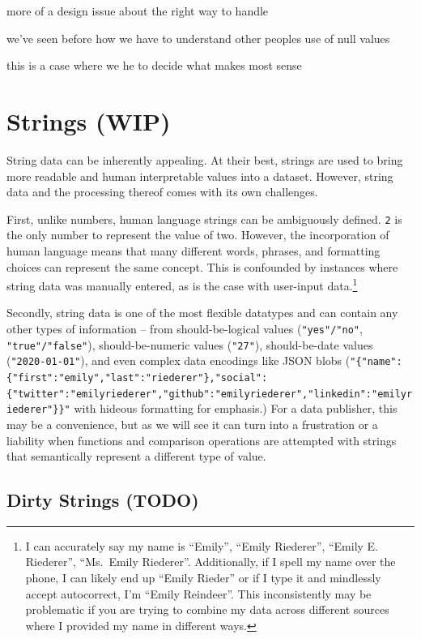 \documentclass[
]{krantz}
\begin{document}
more of a design issue about the right way to handle

we've seen before how we have to understand other peoples use of null values

this is a case where we he to decide what makes most sense

\hypertarget{strings-wip}{%
\section{Strings (WIP)}\label{strings-wip}}

String data can be inherently appealing. At their best, strings are used to bring more readable and human interpretable values into a dataset. However, string data and the processing thereof comes with its own challenges.

First, unlike numbers, human language strings can be ambiguously defined. \texttt{2} is the only number to represent the value of two. However, the incorporation of human language means that many different words, phrases, and formatting choices can represent the same concept. This is confounded by instances where string data was manually entered, as is the case with user-input data.\footnote{I can accurately say my name is ``Emily'', ``Emily Riederer'', ``Emily E. Riederer'', ``Ms.~Emily Riederer''. Additionally, if I spell my name over the phone, I can likely end up ``Emily Rieder'' or if I type it and mindlessly accept autocorrect, I'm ``Emily Reindeer''. This inconsistently may be problematic if you are trying to combine my data across different sources where I provided my name in different ways.}

Secondly, string data is one of the most flexible datatypes and can contain any other types of information -- from should-be-logical values (\texttt{"yes"/"no"}, \texttt{"true"/"false"}), should-be-numeric values (\texttt{"27"}), should-be-date values (\texttt{"2020-01-01"}), and even complex data encodings like JSON blobs (\texttt{"\{"name":\{"first":"emily","last":"riederer"\},"social":\{"twitter":"emilyriederer","github":"emilyriederer","linkedin":"emilyriederer"\}\}"} with hideous formatting for emphasis.) For a data publisher, this may be a convenience, but as we will see it can turn into a frustration or a liability when functions and comparison operations are attempted with strings that semantically represent a different type of value.

\hypertarget{dirty-strings-todo}{%
\subsection{Dirty Strings (TODO)}\label{dirty-strings-todo}}
\end{document}
